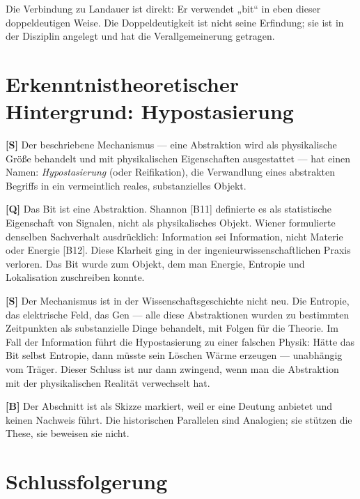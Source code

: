 Die Verbindung zu Landauer ist direkt: Er verwendet „bit“ in eben dieser
doppeldeutigen Weise. Die Doppeldeutigkeit ist nicht seine Erfindung; sie ist in
der Disziplin angelegt und hat die Verallgemeinerung getragen.

\section{Erkenntnistheoretischer Hintergrund: Hypostasierung}

\textbf{[S]} Der beschriebene Mechanismus --- eine Abstraktion wird als physikalische
Größe behandelt und mit physikalischen Eigenschaften ausgestattet --- hat einen
Namen: \emph{Hypostasierung} (oder Reifikation), die Verwandlung eines abstrakten
Begriffs in ein vermeintlich reales, substanzielles Objekt.

\textbf{[Q]} Das Bit ist eine Abstraktion. Shannon [B11] definierte es als statistische
Eigenschaft von Signalen, nicht als physikalisches Objekt. Wiener formulierte
denselben Sachverhalt ausdrücklich: Information sei Information, nicht Materie
oder Energie [B12]. Diese Klarheit ging in der ingenieurwissenschaftlichen Praxis
verloren. Das Bit wurde zum Objekt, dem man Energie, Entropie und Lokalisation
zuschreiben konnte.

\textbf{[S]} Der Mechanismus ist in der Wissenschaftsgeschichte nicht neu. Die Entropie,
das elektrische Feld, das Gen --- alle diese Abstraktionen wurden zu bestimmten
Zeitpunkten als substanzielle Dinge behandelt, mit Folgen für die Theorie. Im Fall
der Information führt die Hypostasierung zu einer falschen Physik: Hätte das Bit
selbst Entropie, dann müsste sein Löschen Wärme erzeugen --- unabhängig vom
Träger. Dieser Schluss ist nur dann zwingend, wenn man die Abstraktion mit der
physikalischen Realität verwechselt hat.

\textbf{[B]} Der Abschnitt ist als Skizze markiert, weil er eine Deutung anbietet und
keinen Nachweis führt. Die historischen Parallelen sind Analogien; sie stützen die
These, sie beweisen sie nicht.

\section{Schlussfolgerung}

